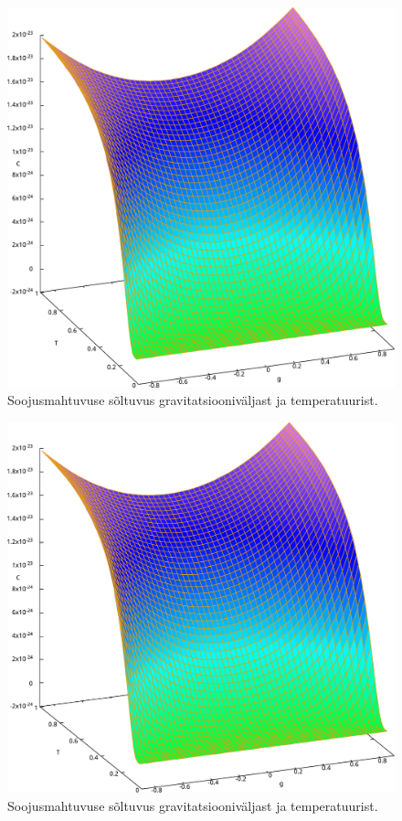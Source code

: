 \documentclass{trkut}%
\begin{document}
\begin{figure}[htb]
    \includegraphics[width=\textwidth]{maxima/m1a1b1T0_1S400_2.pdf}
    \caption{Soojusmahtuvuse sõltuvus gravitatsiooniväljast ja temperatuurist.}
\end{figure}
\begin{figure}[htb]
    \includegraphics[width=\textwidth]{maxima/m1a1b1T0_1S100.pdf}
    \caption{Soojusmahtuvuse sõltuvus gravitatsiooniväljast ja temperatuurist.}
\end{figure}
\end{document}
